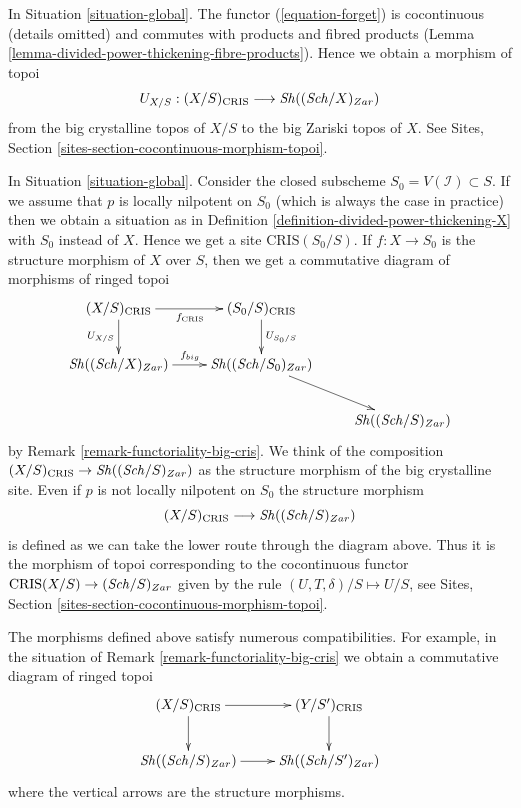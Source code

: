 \begin{remark}
\label{remark-compare-big-zariski}
In Situation \ref{situation-global}.
The functor (\ref{equation-forget}) is cocontinuous (details omitted) and
commutes with products and fibred products
(Lemma \ref{lemma-divided-power-thickening-fibre-products}).
Hence we obtain a morphism of topoi
$$
U_{X/S} : (X/S)_{\text{CRIS}} \longrightarrow \mathop{\mathit{Sh}}\nolimits((\mathit{Sch}/X)_{Zar})
$$
from the big crystalline topos of $X/S$ to the big Zariski topos of $X$.
See Sites, Section \ref{sites-section-cocontinuous-morphism-topoi}.
\end{remark}

\begin{remark}
\label{remark-big-structure-morphism}
In Situation \ref{situation-global}.
Consider the closed subscheme $S_0 = V(\mathcal{I}) \subset S$.
If we assume that $p$ is locally nilpotent on $S_0$ (which is always
the case in practice) then we obtain a situation as in
Definition \ref{definition-divided-power-thickening-X} with $S_0$ instead
of $X$. Hence we get a site $\text{CRIS}(S_0/S)$. If $f : X \to S_0$ is
the structure morphism of $X$ over $S$, then we get a commutative diagram
of morphisms of ringed topoi
$$
\xymatrix{
(X/S)_{\text{CRIS}}
\ar[r]_{f_{\text{CRIS}}} \ar[d]_{U_{X/S}} &
(S_0/S)_{\text{CRIS}} \ar[d]^{U_{S_0/S}} \\
\Sh((\Sch/X)_{Zar}) \ar[r]^{f_{big}} & \Sh((\Sch/S_0)_{Zar}) \ar[rd] \\
& & \Sh((\Sch/S)_{Zar})
}
$$
by Remark \ref{remark-functoriality-big-cris}. We think of the composition
$(X/S)_{\text{CRIS}} \to \mathop{\mathit{Sh}}\nolimits((\mathit{Sch}/S)_{Zar})$ as the structure morphism of
the big crystalline site. Even if $p$ is not locally nilpotent on $S_0$
the structure morphism
$$
(X/S)_{\text{CRIS}} \longrightarrow \mathop{\mathit{Sh}}\nolimits((\mathit{Sch}/S)_{Zar})
$$
is defined as we can take the lower route through the diagram above. Thus it
is the morphism of topoi corresponding to the cocontinuous
functor $\text{CRIS}(X/S) \to (\mathit{Sch}/S)_{Zar}$ given by the rule
$(U, T, \delta)/S \mapsto U/S$, see
Sites, Section \ref{sites-section-cocontinuous-morphism-topoi}.
\end{remark}

\begin{remark}[Compatibilities]
\label{remark-compatibilities-big-cris}
The morphisms defined above satisfy numerous compatibilities. For example,
in the situation of Remark \ref{remark-functoriality-big-cris}
we obtain a commutative diagram of ringed topoi
$$
\xymatrix{
(X/S)_{\text{CRIS}} \ar[d] \ar[r] & (Y/S')_{\text{CRIS}} \ar[d] \\
\Sh((\Sch/S)_{Zar}) \ar[r] & \Sh((\Sch/S')_{Zar})
}
$$
where the vertical arrows are the structure morphisms.
\end{remark}




